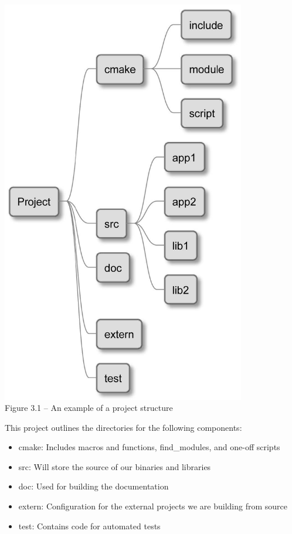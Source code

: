 \begin{center}
\includegraphics[width=0.8\textwidth]{content/1/chapter3/images/1.jpg}\\
Figure 3.1 – An example of a project structure
\end{center}

This project outlines the directories for the following components:

\begin{itemize}
\item 
cmake: Includes macros and functions, find\_modules, and one-off scripts

\item 
src: Will store the source of our binaries and libraries

\item 
doc: Used for building the documentation

\item 
extern: Configuration for the external projects we are building from source

\item 
test: Contains code for automated tests
\end{itemize}

